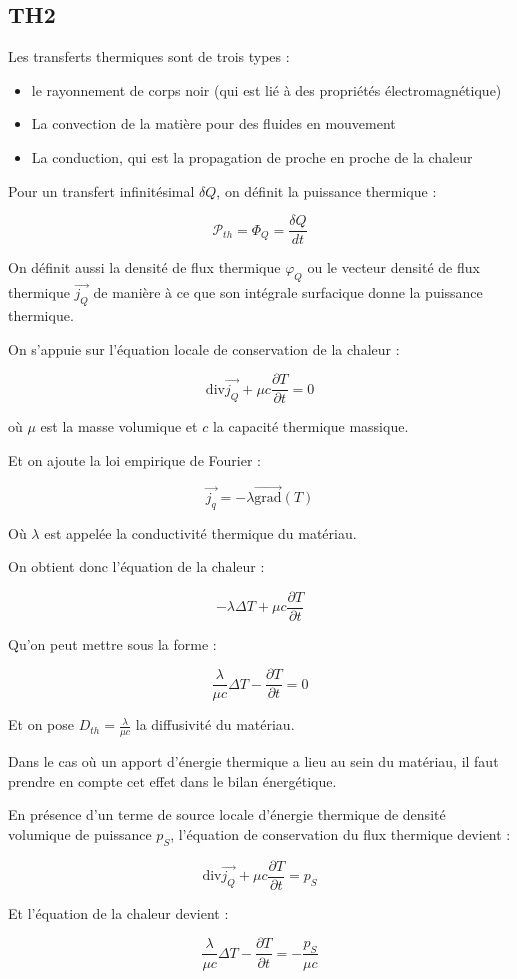 \documentclass[a4paper,12pt]{book}
\newcommand{\Def}[2]{\begin{tcolorbox}[colback=white,colframe=red!10!green!20!blue!75!, title=Définition : #1]#2\end{tcolorbox}}
\newcommand{\Thr}[2]{\begin{tcolorbox}[sharp corners, colback=white,colframe=red!10!blue!30!green!75!, title=Théorème : #1]#2\end{tcolorbox}}
\newcommand{\Grad}{\overrightarrow{\mathrm{grad}}}
\newcommand{\Div}{\mathrm{div}}
\renewcommand{\Vec}[1]{\overrightarrow{#1}}
\begin{document}
\subsection{TH2}
\Def{Transferts thermiques}{Les transferts thermiques sont de trois types :\begin{itemize}
\item le rayonnement de corps noir (qui est lié à des propriétés électromagnétique)
\item La convection de la matière pour des fluides en mouvement
\item La conduction, qui est la propagation de proche en proche de la chaleur
\end{itemize}
Pour un transfert infinitésimal $\delta Q$, on définit la puissance thermique :
\par $$\mathcal{P}_{th}=\Phi_Q =\dfrac{\delta Q}{dt}$$
\par On définit aussi la densité de flux thermique $\varphi_Q$ ou le vecteur densité de flux thermique $\Vec{j_Q}$ de manière à ce que son intégrale surfacique donne la puissance thermique.}
\Thr{L'équation de la chaleur}{On s'appuie sur l'équation locale de conservation de la chaleur :
\par $$\Div\Vec{j_Q} + \mu c\dfrac{\partial T}{\partial t}=0$$
\par où $\mu$ est la masse volumique et $c$ la capacité thermique massique.
\par Et on ajoute la loi empirique de Fourier :
\par $$\Vec{j_q} =-\lambda\Grad(T)$$
\par Où $\lambda$ est appelée la conductivité thermique du matériau.
\par On obtient donc l'équation de la chaleur :
\par $$-\lambda\Delta T +\mu c\dfrac{\partial T}{\partial t}$$
\par Qu'on peut mettre sous la forme :
\par $$\frac{\lambda}{\mu c}\Delta T -\dfrac{\partial T}{\partial t}=0$$
\par Et on pose $D_{th}=\frac{\lambda}{\mu c}$ la diffusivité du matériau.}
\Thr{L'équation générale}{Dans le cas où un apport d'énergie thermique a lieu au sein du matériau, il faut prendre en compte cet effet dans le bilan énergétique.
\par En présence d'un terme de source locale d'énergie thermique de densité volumique de puissance $p_S$, l'équation de conservation du flux thermique devient :
\par $$\Div\Vec{j_Q} +\mu c\dfrac{\partial T}{\partial t}=p_S$$
\par Et l'équation de la chaleur devient :
\par $$\frac{\lambda}{\mu c}\Delta T - \dfrac{\partial T}{\partial t}=-\frac{p_S}{\mu c}$$}
\end{document}

